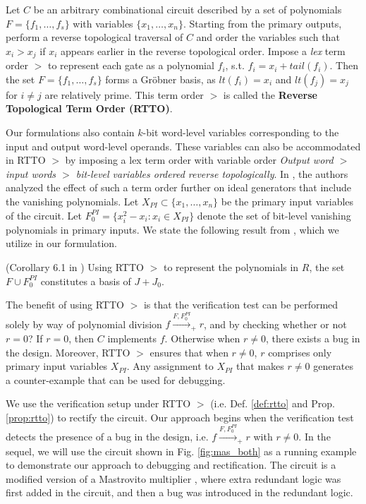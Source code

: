 \begin{Definition}
\label{def:rtto}
Let $C$ be an arbitrary combinational
circuit described by a set of polynomials $F=\{f_1,\dots,f_s\}$ with
variables $\{x_1,\dots,x_n\}$. Starting from the primary outputs,
perform a reverse topological traversal of $C$ and order the variables
such that $x_i>x_j$ if $x_i$ appears earlier in the reverse
topological order. Impose a {\it lex} term order $>$ to
represent each gate as a polynomial $f_i$, s.t. $f_i = x_i +
tail(f_i)$. Then the set $F=\{f_1, \dots, f_s\}$
forms a Gr\"obner basis, as $lt(f_i)=x_i$ and $lt(f_j)=x_j$ for
$i\neq j$ are relatively prime. This term order $>$ is called the {\bf
  Reverse Topological Term   Order (RTTO)}.  
\end{Definition}


Our formulations also contain $k$-bit word-level variables
corresponding to the input and output word-level operands. These
variables can also be accommodated in RTTO $>$ by imposing a lex term
order with variable order {\it Output word $>$ input words $>$
  bit-level variables ordered reverse topologically}.  In
\cite{lv:tcad2013}, the authors analyzed the effect of such a term
order further on ideal generators that include the vanishing
polynomials. Let $X_{PI} \subset \{x_1,\dots,x_n\}$  be the primary
input variables of the circuit. Let $F_0^{PI}=\{x_i^2-x_i:x_i\in
X_{PI}\}$ denote the set of bit-level vanishing polynomials in primary
inputs. We state the following result from \cite{lv:tcad2013}, which
we utilize in our formulation. 


\begin{Proposition}\label{prop:rtto}
(Corollary 6.1 in \cite{lv:tcad2013}) Using RTTO $>$ to represent the
  polynomials in $R$, the set $F\cup F_{0}^{PI}$ constitutes a
  \Grobner basis of $J+J_0$.  
\end{Proposition}

The benefit of using RTTO $>$ is that the verification test can be
performed solely by way of polynomial division
$f\xrightarrow{F,F_{0}^{PI}}_+r$, and by checking whether or not $r=0$?
If $r=0$, then $C$ implements $f$. Otherwise when $r\neq 0$, there
exists a bug in the design. Moreover, RTTO $>$ ensures that when
$r\neq 0$, $r$ comprises only primary input variables $X_{PI}$. Any
assignment to $X_{PI}$ that makes $r\neq 0$ generates a
counter-example that can be used for debugging. 

We use the verification setup under RTTO $>$ (i.e. Def. \ref{def:rtto}
and Prop. \ref{prop:rtto}) to rectify the circuit. Our approach begins
when the verification test detects the presence of a bug in the
design, i.e. $f\xrightarrow{F,F_{0}^{PI}}_+r$ with $r\neq 0$. 
In the sequel, we will use the circuit shown in
Fig. \ref{fig:mas_both} as a running example to demonstrate our
approach to debugging and rectification. The circuit is a modified
version of a Mastrovito multiplier \cite{mastro:1989}, where extra
redundant logic was first added in the circuit, and then a bug was
introduced in the redundant logic. 

